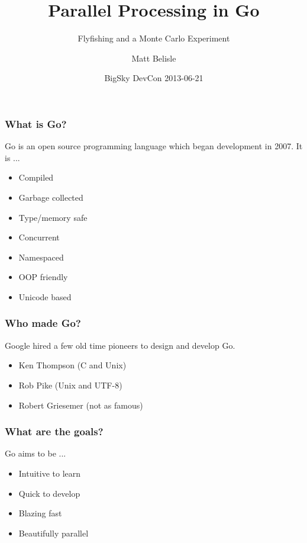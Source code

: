 \documentclass{beamer}
\title{Parallel Processing in Go}
\subtitle{Flyfishing and a Monte Carlo Experiment}
\author{Matt Belisle}
\date{BigSky DevCon 2013-06-21}
\begin{document}
\frame{\titlepage}
\begin{frame}
  \frametitle{What is Go?}

  Go is an open source programming language which began development in
  2007.  It is ...
  
  \begin{itemize}
    \item Compiled
    \item Garbage collected
    \item Type/memory safe
    \item Concurrent
    \item Namespaced
    \item OOP friendly
    \item Unicode based
  \end{itemize}
\end{frame}
\begin{frame}
  \frametitle{Who made Go?}

  Google hired a few old time pioneers to design and develop Go.
  
  \begin{itemize}
    \item Ken Thompson (C and Unix)
    \item Rob Pike (Unix and UTF-8)
    \item Robert Griesemer (not as famous)
  \end{itemize}
\end{frame}
\begin{frame}
  \frametitle{What are the goals?}

  Go aims to be ...
  
  \begin{itemize}
    \item Intuitive to learn
    \item Quick to develop
    \item Blazing fast
    \item Beautifully parallel
  \end{itemize}
\end{frame}
\end{document}
